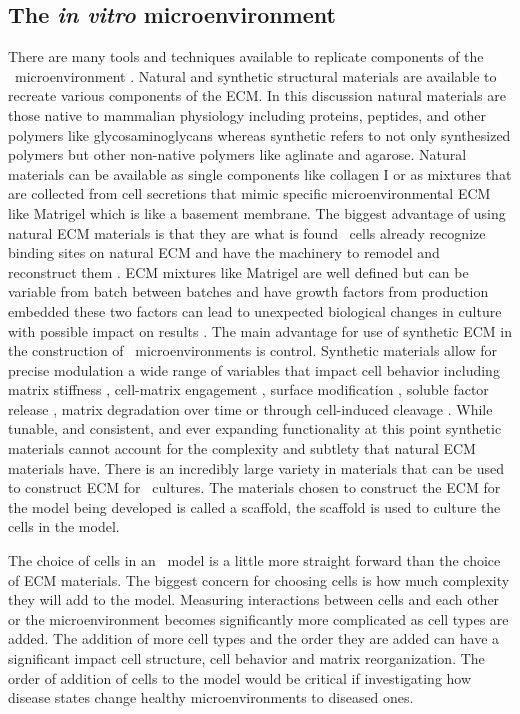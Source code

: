 \subsection{The \textit{in vitro} microenvironment}
There are many tools and techniques available to replicate components of the \invivo\ microenvironment \invitro. Natural and synthetic structural materials are available to recreate various components of the ECM. In this discussion natural materials are those native to mammalian physiology including proteins, peptides, and other polymers like glycosaminoglycans whereas synthetic refers to not only synthesized polymers but other non-native polymers like aglinate and agarose. Natural materials can be available as single components like collagen I or as mixtures that are collected from cell secretions that mimic specific microenvironmental ECM like Matrigel which is like a basement membrane. The biggest advantage of using natural ECM materials is that they are what is found \invivo\ cells already recognize binding sites on natural ECM and have the machinery to remodel and reconstruct them \cite{Mano2007}. ECM mixtures like Matrigel are well defined but can be variable from batch between batches and have growth factors from production embedded these two factors can lead to unexpected biological changes in culture with possible impact on results \cite{Hughes2010Matrigel:Culture.}. The main advantage for use of synthetic ECM in the construction of \invitro\ microenvironments is control. Synthetic materials allow for precise modulation a wide range of variables that impact cell behavior including matrix stiffness \cite{Peyton2008TheSystem}, cell-matrix engagement \cite{Hsiong2008Integrin-AdhesionMatrices}, surface modification \cite{Jongpaiboonkit2009GrowthMicrospheres.}, soluble factor release \cite{Belair2016DifferentialMicrospheres}, matrix degradation over time \cite{Gunatillake2003BiodegradableEngineering.} or through cell-induced cleavage \cite{Tibbitt2009HydrogelsCulture}. While tunable, and consistent, and ever expanding functionality at this point synthetic materials cannot account for the complexity and subtlety that natural ECM materials have. There is an incredibly large variety in materials that can be used to construct ECM for \invitro\ cultures. The materials chosen to construct the ECM for the model being developed is called a scaffold, the scaffold is used to culture the cells in the model. 

The choice of cells in an \invitro\ model is a little more straight forward than the choice of ECM materials. The biggest concern for choosing cells is how much complexity they will add to the model. Measuring interactions between cells and each other or the microenvironment becomes significantly more complicated as cell types are added. The addition of more cell types and the order they are added can have a significant impact cell structure, cell behavior and matrix reorganization. The order of addition of cells to the model would be critical if investigating how disease states change healthy microenvironments to diseased ones. 

